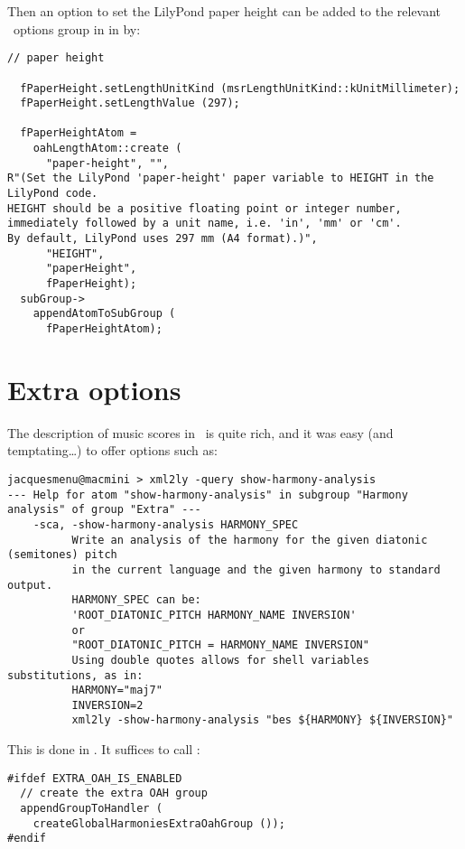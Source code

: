 Then an option to set the LilyPond paper height can be added to the relevant \oahRepr\ options group in  in  by:
\begin{lstlisting}[language=CPlusPlus]
  // paper height

  fPaperHeight.setLengthUnitKind (msrLengthUnitKind::kUnitMillimeter);
  fPaperHeight.setLengthValue (297);

  fPaperHeightAtom =
    oahLengthAtom::create (
      "paper-height", "",
R"(Set the LilyPond 'paper-height' paper variable to HEIGHT in the LilyPond code.
HEIGHT should be a positive floating point or integer number,
immediately followed by a unit name, i.e. 'in', 'mm' or 'cm'.
By default, LilyPond uses 297 mm (A4 format).)",
      "HEIGHT",
      "paperHeight",
      fPaperHeight);
  subGroup->
    appendAtomToSubGroup (
      fPaperHeightAtom);
\end{lstlisting}


\section{Extra options}

The description of music scores in \mf\ is quite rich, and it was easy (and temptating\dots) to offer options such as:
\begin{lstlisting}[language=Terminal]
jacquesmenu@macmini > xml2ly -query show-harmony-analysis
--- Help for atom "show-harmony-analysis" in subgroup "Harmony analysis" of group "Extra" ---
    -sca, -show-harmony-analysis HARMONY_SPEC
          Write an analysis of the harmony for the given diatonic (semitones) pitch
          in the current language and the given harmony to standard output.
          HARMONY_SPEC can be:
          'ROOT_DIATONIC_PITCH HARMONY_NAME INVERSION'
          or
          "ROOT_DIATONIC_PITCH = HARMONY_NAME INVERSION"
          Using double quotes allows for shell variables substitutions, as in:
          HARMONY="maj7"
          INVERSION=2
          xml2ly -show-harmony-analysis "bes ${HARMONY} ${INVERSION}"
\end{lstlisting}

This is done in . It suffices to call :
\begin{lstlisting}[language=CPlusPlus]
#ifdef EXTRA_OAH_IS_ENABLED
  // create the extra OAH group
  appendGroupToHandler (
    createGlobalHarmoniesExtraOahGroup ());
#endif
\end{lstlisting}

